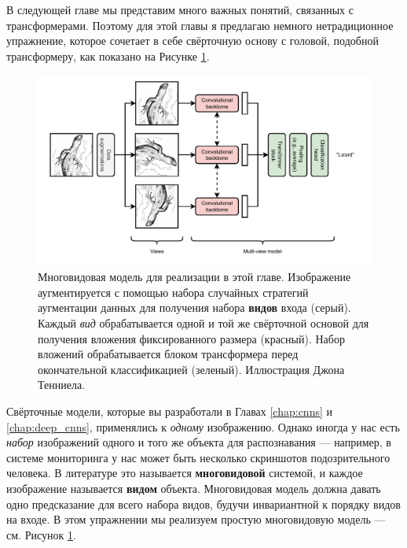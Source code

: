 В следующей главе мы представим много важных понятий, связанных с трансформерами. Поэтому для этой главы я предлагаю немного нетрадиционное упражнение, которое сочетает в себе свёрточную основу с головой, подобной трансформеру, как показано на Рисунке \ref{fig:multiview_model}.

\begin{figure}[t]
    \centering
    \hspace{1em}\includegraphics[width=1\textwidth]{images/Multiviewmodel}
    \caption{Многовидовая модель для реализации в этой главе. Изображение аугментируется с помощью набора случайных стратегий аугментации данных для получения набора \textbf{видов} входа ({\color{gray!30}серый}). Каждый \textit{вид} обрабатывается одной и той же свёрточной основой для получения вложения фиксированного размера ({\color{drawred!30}красный}). Набор вложений обрабатывается блоком трансформера перед окончательной классификацией ({\color{drawgreen!30}зеленый}). Иллюстрация Джона Тенниела.}
    \label{fig:multiview_model}
\end{figure}

Свёрточные модели, которые вы разработали в Главах \ref{chap:cnns} и \ref{chap:deep_cnns}, применялись к \textit{одному} изображению. Однако иногда у нас есть \textit{набор} изображений одного и того же объекта для распознавания — например, в системе мониторинга у нас может быть несколько скриншотов подозрительного человека. В литературе это называется \textbf{многовидовой} системой, и каждое изображение называется \textbf{видом} объекта. Многовидовая модель должна давать одно предсказание для всего набора видов, будучи инвариантной к порядку видов на входе. В этом упражнении мы реализуем простую многовидовую модель — см. Рисунок \ref{fig:multiview_model}.

